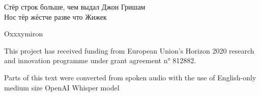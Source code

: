 \epigraph{\begin{otherlanguage}{russian}
Стёр строк больше, чем выдал Джон Гришам \\ Нос тёр жёстче разве что Жижек
\end{otherlanguage}}{Oxxxymiron}



This project has received funding from European Union’s Horizon 2020 research and innovation programme under grant agreement n° 812882. 

Parts of this text were converted from spoken audio with the use of English-only medium size OpenAI Whisper model \cite{radfordRobustSpeechRecognition2022}